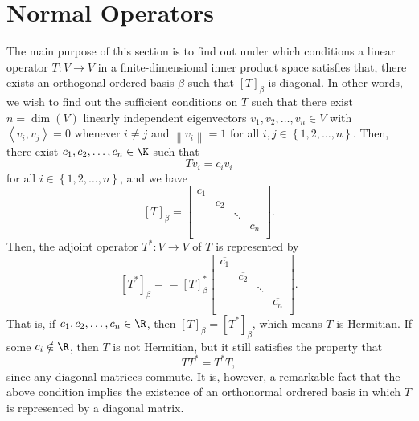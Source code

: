 \documentclass[linearalgebra]{subfiles}
\begin{document}
    \section{Normal Operators}
    
    \begin{remark}
        The main purpose of this section is to find out under which conditions a linear operator $T:V\to V$ in a finite-dimensional inner product space satisfies that, there exists an orthogonal ordered basis $\beta$ such that $\left[ T \right] _\beta$ is diagonal. In other words, we wish to find out the sufficient conditions on $T$ such that there exist $n=\dim(V)$ linearly independent eigenvectors $v_1,v_2,\ldots,v_n\in V$ with $\left\langle v_i, v_j\right\rangle = 0$ whenever $i\neq j$ and $\left\lVert v_i\right\rVert = 1$ for all $i,j\in\left\lbrace 1,2,\ldots,n \right\rbrace$. Then, there exist $c_1,c_2,\ldots,c_n\in\K$ such that
        \begin{equation*}
            Tv_i = c_iv_i
        \end{equation*}
        for all $i\in\left\lbrace 1,2,\ldots,n \right\rbrace$, and we have
        \begin{equation*}
            \left[ T \right] _\beta = 
            \begin{bmatrix}
                c_1 & & & \\
                & c_2 & & \\
                & & \ddots & \\
                & & & c_n \\
            \end{bmatrix}.
        \end{equation*}
        Then, the adjoint operator $T^*:V\to V$ of $T$ is represented by
        \begin{equation*}
            \left[ T^* \right] _\beta = = \left[ T \right] _\beta^*
            \begin{bmatrix}
                \overline{c_1} & & & \\
                & \overline{c_2} & & \\
                & & \ddots& \\
                & & & \overline{c_n} \\
            \end{bmatrix}.
        \end{equation*}
        That is, if $c_1,c_2,\ldots,c_n\in\R$, then $\left[ T \right] _\beta = \left[ T^* \right] _\beta$, which means $T$ is Hermitian. If some $c_i\notin\R$, then $T$ is not Hermitian, but it still satisfies the property that
        \begin{equation*}
            TT^* = T^*T,
        \end{equation*}
        since any diagonal matrices commute. It is, however, a remarkable fact that the above condition implies the existence of an orthonormal ordrered basis in which $T$ is represented by a diagonal matrix.
    \end{remark}
\end{document}
